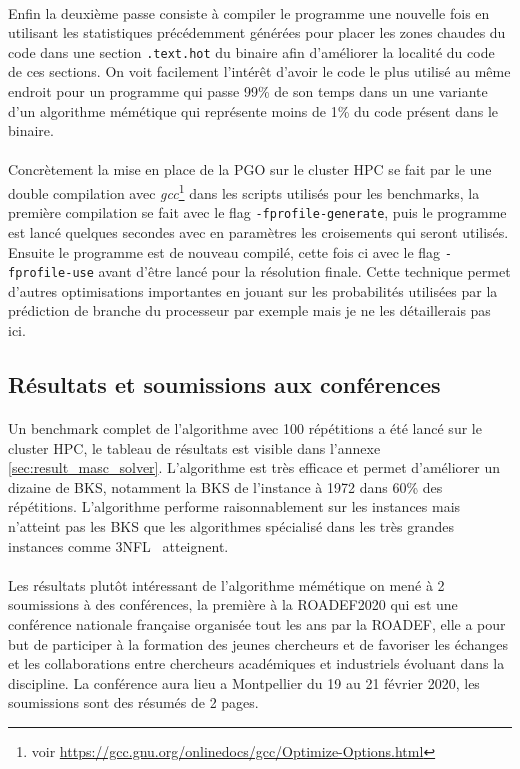 \documentclass[a4paper,11pt,twoside,french,report]{../common/simplem}
\begin{document}
				\paragraph*{}
					Enfin la deuxième passe consiste à compiler le programme une nouvelle fois en utilisant les statistiques précédemment générées pour placer les zones chaudes du code dans une section \texttt{.text.hot} du binaire afin d'améliorer la localité du code de ces sections. On voit facilement l'intérêt d'avoir le code le plus utilisé au même endroit pour un programme qui passe 99\% de son temps dans un une variante d'un algorithme mémétique qui représente moins de 1\% du code présent dans le binaire.
				\paragraph*{}
					Concrètement la mise en place de la \gls{PGO} sur le cluster \gls{HPC} se fait par le une double compilation avec \textit{gcc}\footnote{voir \url{https://gcc.gnu.org/onlinedocs/gcc/Optimize-Options.html}} dans les scripts utilisés pour les benchmarks, la première compilation se fait avec le flag \texttt{-fprofile-generate}, puis le programme est lancé quelques secondes avec en paramètres les croisements qui seront utilisés. Ensuite le programme est de nouveau compilé, cette fois ci avec le flag \texttt{-fprofile-use} avant d'être lancé pour la résolution finale. Cette technique permet d'autres optimisations importantes en jouant sur les probabilités utilisées par la prédiction de branche du processeur par exemple mais je ne les détaillerais pas ici.
			\subsection{Résultats et soumissions aux conférences}\label{sec:conferences}
				\paragraph*{}
					Un benchmark complet de l'algorithme avec 100 répétitions a été lancé sur le cluster \gls{HPC}, le tableau de résultats est visible dans l'annexe \ref{sec:result_masc_solver}. L'algorithme est très efficace et permet d'améliorer un dizaine de \gls{BKS}, notamment la \gls{BKS} de l'instance  à 1972 dans 60\% des répétitions. L'algorithme performe raisonnablement sur les instances  mais n'atteint pas les \gls{BKS} que les algorithmes spécialisé dans les très grandes instances comme 3NFL~\cite{Yagiura2006} atteignent.
				\paragraph*{}
					Les résultats plutôt intéressant de l'algorithme mémétique on mené à 2 soumissions à des conférences, la première à la \acrshort{ROADEF2020} qui est une conférence nationale française organisée tout les ans par la \gls{ROADEF}, elle a pour but de participer à la formation des jeunes chercheurs et de favoriser les échanges et les collaborations entre chercheurs académiques et industriels évoluant dans la discipline. La conférence aura lieu a Montpellier du 19 au 21 février 2020, les soumissions sont des résumés de 2 pages.
\end{document}
